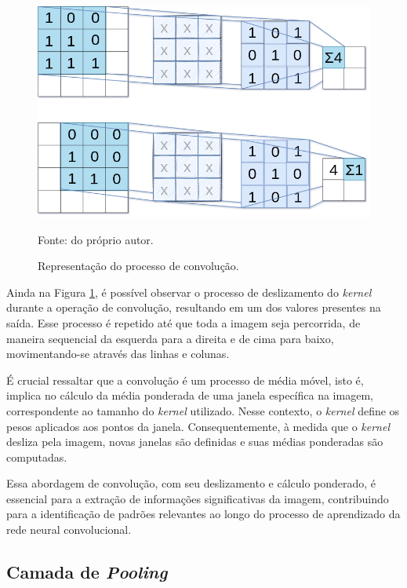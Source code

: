 \begin{figure}[H]
    \centering
    \caption{Representação do processo de convolução.}
    \includegraphics[width=1\linewidth]{recursos/imagens/deep/2d_convolution.png}
    \label{cnn:fig:6}

    Fonte: do próprio autor.
\end{figure}

Ainda na Figura \ref{cnn:fig:6}, é possível observar o processo de deslizamento do \textit{kernel} durante a operação de convolução, resultando em um dos valores presentes na saída. Esse processo é repetido até que toda a imagem seja percorrida, de maneira sequencial da esquerda para a direita e de cima para baixo, movimentando-se através das linhas e colunas.

É crucial ressaltar que a convolução é um processo de média móvel, isto é, implica no cálculo da média ponderada de uma janela específica na imagem, correspondente ao tamanho do \textit{kernel} utilizado. Nesse contexto, o \textit{kernel} define os pesos aplicados aos pontos da janela. Consequentemente, à medida que o \textit{kernel} desliza pela imagem, novas janelas são definidas e suas médias ponderadas são computadas.

Essa abordagem de convolução, com seu deslizamento e cálculo ponderado, é essencial para a extração de informações significativas da imagem, contribuindo para a identificação de padrões relevantes ao longo do processo de aprendizado da rede neural convolucional.


\subsection{Camada de \textit{Pooling}}
\label{cnn:pooling}

